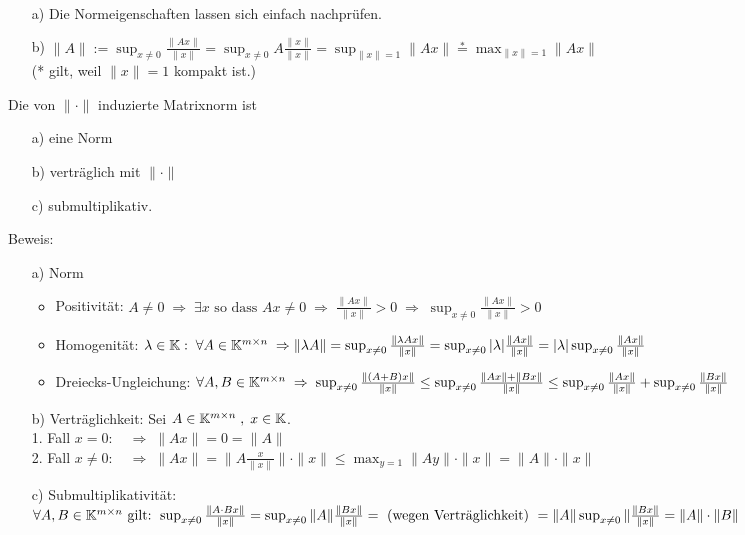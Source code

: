 \begin{Bemerkungen}
\quad \\
  \begin{enumerate}
    \item[a)] Die Normeigenschaften lassen sich einfach nachprüfen.
    \item[b)] $\|A\| := \sup_{ x\ne 0} \frac{\| A x \|}{\| x \|} =
    \sup_{ x\ne 0}  A \frac{\| x \|}{\| x \|} = \sup_{ \|x \| = 1} \| A x \|
   \overset{*}{=} \max_{ \|x \| = 1} \| A x \| \;$\\
   (* gilt, weil $ \|x \| = 1$ kompakt ist.)
  \end{enumerate}
\end{Bemerkungen}

\begin{Satz} Die von $\| \cdot \|$  induzierte Matrixnorm ist\\
  \begin{enumerate}
    \item [a)] eine Norm
    \item [b)] verträglich mit $\| \cdot \|$
    \item [c)] submultiplikativ.
  \end{enumerate}
\end{Satz}
Beweis:
\begin{enumerate}
  \item [a)] Norm
    \begin{itemize}
      \item Positivität: $A \ne 0 \; \Rightarrow \; \exists x \text{ so dass }
    A x \ne 0 \; \Rightarrow \; \frac{\| A x \|}{\| x \|} > 0
    \; \Rightarrow \;  \sup_{ x\ne 0} \frac{\| A x \|}{\| x \|} > 0$
      \item Homogenität: $\lambda \in \mathbb K:\; \forall A \in \mathbb K^{m \times n} \;
      \Rightarrow \| \lambda A \| = \sup_{ x\ne 0} \frac{\| \lambda A x \|}{\| x \|} =
      \sup_{ x\ne 0} |\lambda|  \frac{\| A x \|}{\| x \|} =
      |\lambda| \sup_{ x\ne 0} \frac{\| A x \|}{\| x \|}$
      \item Dreiecks-Ungleichung: $\forall A, B  \in \mathbb K^{m \times n} \; \Rightarrow \;
      \sup_{ x\ne 0} \frac{\| (A + B) x \|}{\| x \|} \le
      \sup_{ x\ne 0} \frac{\| A x \| + \| B x \|}{\| x \|} \le
      \sup_{ x\ne 0} \frac{\| A x \|}{\| x \|} + \sup_{ x\ne 0} \frac{\| B x \|}{\| x \|}$
    \end{itemize}
  \item [b)] Verträglichkeit: Sei $A \in \mathbb K^{m \times n} \; , \; x \in \mathbb K$.\\
    1. Fall $x = 0  : \quad \Rightarrow \; \| A x \| = 0 = \|A \| $\\
    2. Fall $x \ne 0  : \quad \Rightarrow \; \| A x \| =
    \| A \frac{x}{\|x\|}\| \cdot \| x \| \le
    \max_{y = 1} \| A y \| \cdot \| x \| = \| A \| \cdot \| x \|$
  \item [c)] Submultiplikativität: $\forall A, B  \in \mathbb K^{m \times n} \text{ gilt: }
  \sup_{ x\ne 0} \frac{\| A \cdot B x \|}{\| x \|} =
  \sup_{ x\ne 0} \| A \| \frac{\| B x \|}{\| x \|} = \\
  \text{ (wegen Verträglichkeit) } = \| A \|  \sup_{ x\ne 0}  \| \frac{\| B x \|}{\| x \|}
  = \|A\| \cdot \|B\|$
\end{enumerate}


